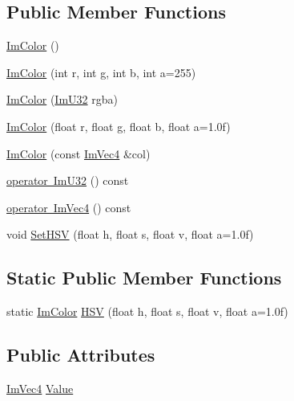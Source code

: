\subsection*{Public Member Functions}
\begin{DoxyCompactItemize}
\item 
\mbox{\hyperlink{struct_im_color_a95206b688dcc03f725790538c74f4526}{Im\+Color}} ()
\item 
\mbox{\hyperlink{struct_im_color_ab4ba02f8290d5dadc1ebc57b2c8a9cbe}{Im\+Color}} (int r, int g, int b, int a=255)
\item 
\mbox{\hyperlink{struct_im_color_ad306332841a2b1f903f40262a19f9412}{Im\+Color}} (\mbox{\hyperlink{imgui_8h_a118cff4eeb8d00e7d07ce3d6460eed36}{Im\+U32}} rgba)
\item 
\mbox{\hyperlink{struct_im_color_a92b53917ca9d90a7207b18270ff5453d}{Im\+Color}} (float r, float g, float b, float a=1.\+0f)
\item 
\mbox{\hyperlink{struct_im_color_aa5306926b3ef766a8647b26bdfd9f8d2}{Im\+Color}} (const \mbox{\hyperlink{struct_im_vec4}{Im\+Vec4}} \&col)
\item 
\mbox{\hyperlink{struct_im_color_a4f4fc53e0676d50404d6d5ffcf16637f}{operator Im\+U32}} () const
\item 
\mbox{\hyperlink{struct_im_color_a10f1de242f13c93f8be64545e4cbcb0a}{operator Im\+Vec4}} () const
\item 
void \mbox{\hyperlink{struct_im_color_afcff20160db703b956d56e5a9fa88e24}{Set\+H\+SV}} (float h, float s, float v, float a=1.\+0f)
\end{DoxyCompactItemize}
\subsection*{Static Public Member Functions}
\begin{DoxyCompactItemize}
\item 
static \mbox{\hyperlink{struct_im_color}{Im\+Color}} \mbox{\hyperlink{struct_im_color_ac8cb52119648523038818a613becf010}{H\+SV}} (float h, float s, float v, float a=1.\+0f)
\end{DoxyCompactItemize}
\subsection*{Public Attributes}
\begin{DoxyCompactItemize}
\item 
\mbox{\hyperlink{struct_im_vec4}{Im\+Vec4}} \mbox{\hyperlink{struct_im_color_a4cf43bd58e30decaa0248f839fc85e95}{Value}}
\end{DoxyCompactItemize}


